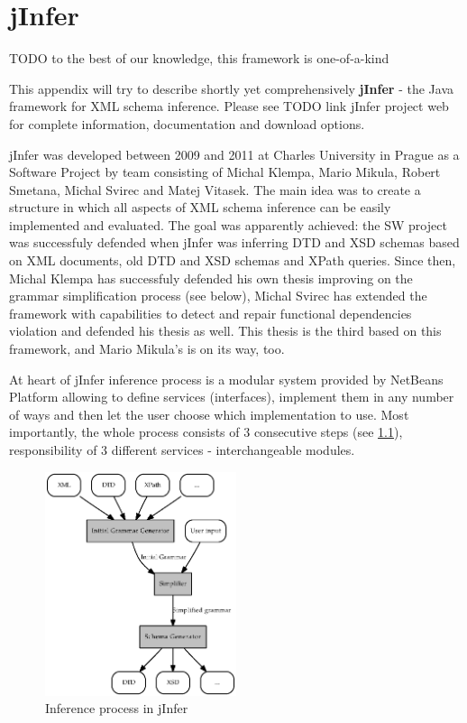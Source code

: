 \documentclass[a4paper,12pt,oneside]{report}
\let\openright=\clearpage
\begin{document}
\appendix

\openright
{}

\chapter{jInfer}
\label{jInfer}

TODO to the best of our knowledge, this framework is one-of-a-kind

This appendix will try to describe shortly yet comprehensively \textbf{jInfer} - the Java framework for XML schema inference. Please see TODO link jInfer project web for complete information, documentation and download options.

jInfer was developed between 2009 and 2011 at Charles University in Prague as a Software Project by team consisting of Michal Klempa, Mario Mikula, Ro\-bert Sme\-ta\-na, Michal Svirec and Matej Vitasek. The main idea was to create a structure in which all aspects of XML schema inference can be easily implemented and evaluated. The goal was apparently achieved: the SW project was successfuly defended when jInfer was inferring DTD and XSD schemas based on XML documents, old DTD and XSD schemas and XPath queries. Since then, Michal Klempa has successfuly defended his own thesis improving on the grammar simplification process (see below), Michal Svirec has extended the framework with capabilities to detect and repair functional dependencies violation and defended his thesis as well. This thesis is the third based on this framework, and Mario Mikula's is on its way, too.

At heart of jInfer inference process is a modular system provided by NetBeans Platform allowing to define services (interfaces), implement them in any number of ways and then let the user choose which implementation to use. Most importantly, the whole process consists of 3 consecutive steps (see \ref{image-inference-process}), responsibility of 3 different services - interchangeable modules.

\begin{figure}
  \caption{Inference process in jInfer}
  \label{image-inference-process}
  \centering
    \includegraphics[width=0.5\textwidth]{images/inference-process.eps}
\end{figure}
\end{document}
